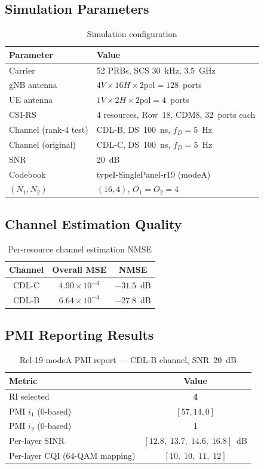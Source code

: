 \documentclass[11pt,a4paper]{article}
\begin{document}
\subsection{Simulation Parameters}

\begin{table}[h]
\centering
\caption{Simulation configuration}
\begin{tabular}{ll}
\toprule
Parameter & Value \\
\midrule
Carrier & 52 PRBs, SCS 30~kHz, 3.5~GHz \\
gNB antenna & $4V \times 16H \times 2\text{pol} = 128$~ports \\
UE antenna & $1V \times 2H \times 2\text{pol} = 4$~ports \\
CSI-RS & 4 resources, Row~18, CDM8, 32~ports each \\
Channel (rank-4 test) & CDL-B, DS~100~ns, $f_D = 5$~Hz \\
Channel (original) & CDL-C, DS~100~ns, $f_D = 5$~Hz \\
SNR & 20~dB \\
Codebook & typeI-SinglePanel-r19 (modeA) \\
$(N_1,N_2)$ & $(16,4)$, $O_1=O_2=4$ \\
\bottomrule
\end{tabular}
\end{table}

\subsection{Channel Estimation Quality}

\begin{table}[h]
\centering
\caption{Per-resource channel estimation NMSE}
\begin{tabular}{ccc}
\toprule
Channel & Overall MSE & NMSE \\
\midrule
CDL-C & $4.90 \times 10^{-4}$ & $-31.5$~dB \\
CDL-B & $6.64 \times 10^{-4}$ & $-27.8$~dB \\
\bottomrule
\end{tabular}
\end{table}

\subsection{PMI Reporting Results}

\begin{table}[h]
\centering
\caption{Rel-19 modeA PMI report --- CDL-B channel, SNR~20~dB}
\begin{tabular}{lc}
\toprule
Metric & Value \\
\midrule
RI selected & \textbf{4} \\
PMI $i_1$ (0-based) & $[57, 14, 0]$ \\
PMI $i_2$ (0-based) & 1 \\
Per-layer SINR & $[12.8,\;13.7,\;14.6,\;16.8]$~dB \\
Per-layer CQI (64-QAM mapping) & $[10,\;10,\;11,\;12]$ \\
\bottomrule
\end{tabular}
\end{table}
\end{document}
